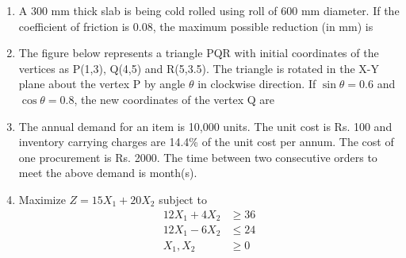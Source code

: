 \documentclass[journal,11pt,onecolumn]{IEEEtran}
\begin{document}
\begin{enumerate}[resume]
\begin{enumerate}

          \end{enumerate}

    \item A 300 mm thick slab is being cold rolled using roll of 600 mm diameter. If the coefficient of friction is 0.08, the maximum possible reduction (in mm) is \underline{\hspace{2cm}}

    \item The figure below represents a triangle PQR with initial coordinates of the vertices as P(1,3), Q(4,5) and R(5,3.5). The triangle is rotated in the X-Y plane about the vertex P by angle $\theta$ in clockwise direction. If $\sin \theta = 0.6$ and $\cos \theta = 0.8$, the new coordinates of the vertex Q are

          \begin{enumerate}


          \end{enumerate}

    \item The annual demand for an item is 10,000 units. The unit cost is Rs. 100 and inventory carrying charges are 14.4\% of the unit cost per annum. The cost of one procurement is Rs. 2000. The time between two consecutive orders to meet the above demand is \underline{\hspace{2cm}} month(s).

    \item Maximize $Z=15X_1 + 20X_2$
          subject to
          \begin{align}
              12X_1 + 4X_2 & \geq 36 \\
              12X_1 - 6X_2 & \leq 24 \\
              X_1, X_2     & \geq 0
          \end{align}


\end{enumerate}
\end{document}
